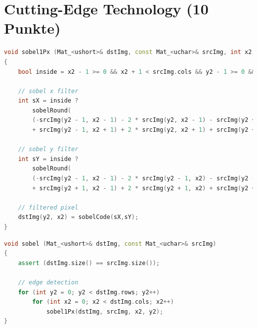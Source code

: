\documentclass{ezb}
\begin{document}

\section{Cutting-Edge Technology (10 Punkte)}

\begin{lstlisting}[language=C++, caption=Core routine for \textbackslash c sobel]
void sobel1Px (Mat_<ushort>& dstImg, const Mat_<uchar>& srcImg, int x2, int y2)
{
	bool inside = x2 - 1 >= 0 && x2 + 1 < srcImg.cols && y2 - 1 >= 0 && y2 + 1 < srcImg.rows;

	// sobel x filter
	int sX = inside ?
		sobelRound(
		(-srcImg(y2 - 1, x2 - 1) - 2 * srcImg(y2, x2 - 1) - srcImg(y2 + 1, x2 - 1)
		+ srcImg(y2 - 1, x2 + 1) + 2 * srcImg(y2, x2 + 1) + srcImg(y2 + 1, x2 + 1)) * 0.125f) : 0;

	// sobel y filter
	int sY = inside ?
		sobelRound(
		(-srcImg(y2 - 1, x2 - 1) - 2 * srcImg(y2 - 1, x2) - srcImg(y2 - 1, x2 + 1)
		+ srcImg(y2 + 1, x2 - 1) + 2 * srcImg(y2 + 1, x2) + srcImg(y2 + 1, x2 + 1)) * 0.125f) : 0;

	// filtered pixel
	dstImg(y2, x2) = sobelCode(sX,sY);
}
\end{lstlisting}

\begin{lstlisting}[language=C++, caption=Slow implementation of the sobelX/Y filter]
void sobel (Mat_<ushort>& dstImg, const Mat_<uchar>& srcImg)
{
	assert (dstImg.size() == srcImg.size());
	
	// edge detection
	for (int y2 = 0; y2 < dstImg.rows; y2++)
		for (int x2 = 0; x2 < dstImg.cols; x2++)
			sobel1Px(dstImg, srcImg, x2, y2);
}
\end{lstlisting}
\end{document}
